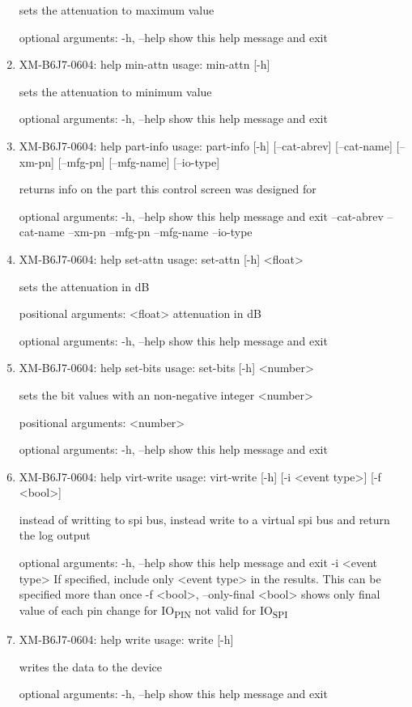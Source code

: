 \documentclass[11pt]{article}
\begin{document}
\begin{enumerate}
sets the attenuation to maximum value

optional arguments:
  -h, --help  show this help message and exit

\item XM-B6J7-0604: help min-attn
\label{sec:orgba12f50}
usage: min-attn [-h]

sets the attenuation to minimum value

optional arguments:
  -h, --help  show this help message and exit

\item XM-B6J7-0604: help part-info
\label{sec:orgfd3b46d}
usage: part-info  [-h] [--cat-abrev] [--cat-name] [--xm-pn] [--mfg-pn] [--mfg-name]
        [--io-type]

returns info on the part this control screen was designed for

optional arguments:
  -h, --help   show this help message and exit
  --cat-abrev
  --cat-name
  --xm-pn
  --mfg-pn
  --mfg-name
  --io-type

\item XM-B6J7-0604: help set-attn
\label{sec:orgb11d43d}
usage: set-attn [-h] <float>

sets the attenuation in dB

positional arguments:
  <float>     attenuation in dB

optional arguments:
  -h, --help  show this help message and exit

\item XM-B6J7-0604: help set-bits
\label{sec:org580e85a}
usage: set-bits [-h] <number>

sets the bit values with an non-negative integer <number>

positional arguments:
  <number>

optional arguments:
  -h, --help  show this help message and exit

\item XM-B6J7-0604: help virt-write
\label{sec:orgd0dd4a5}
usage: virt-write [-h] [-i <event type>] [-f <bool>]

instead of writting to spi bus, instead write to a virtual spi bus and return
the log output

optional arguments:
  -h, --help            show this help message and exit
  -i <event type>       If specified, include only <event type> in the
                        results. This can be specified more than once
  -f <bool>, --only-final <bool>
                        shows only final value of each pin change for IO\textsubscript{PIN}
                        not valid for IO\textsubscript{SPI}

\item XM-B6J7-0604: help write
\label{sec:orgce82494}
usage: write [-h]

writes the data to the device

optional arguments:
  -h, --help  show this help message and exit
\end{enumerate}
\end{document}
